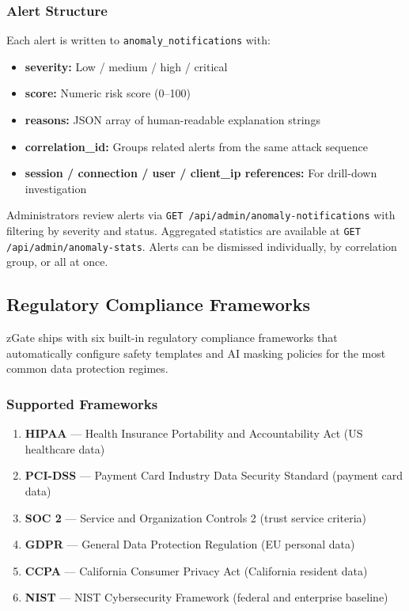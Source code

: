 \subsubsection{Alert Structure}

Each alert is written to \texttt{anomaly\_notifications} with:

\begin{itemize}[leftmargin=*]
    \item \textbf{severity:} Low / medium / high / critical
    \item \textbf{score:} Numeric risk score (0–100)
    \item \textbf{reasons:} JSON array of human-readable explanation strings
    \item \textbf{correlation\_id:} Groups related alerts from the same attack sequence
    \item \textbf{session / connection / user / client\_ip references:} For drill-down investigation
\end{itemize}

Administrators review alerts via \texttt{GET /api/admin/anomaly-notifications} with filtering by severity and status. Aggregated statistics are available at \texttt{GET /api/admin/anomaly-stats}. Alerts can be dismissed individually, by correlation group, or all at once.

\subsection{Regulatory Compliance Frameworks}
\label{subsec:compliance-frameworks}

zGate ships with six built-in regulatory compliance frameworks that automatically configure safety templates and AI masking policies for the most common data protection regimes.

\subsubsection{Supported Frameworks}

\begin{enumerate}[leftmargin=*]
    \item \textbf{HIPAA} — Health Insurance Portability and Accountability Act (US healthcare data)
    \item \textbf{PCI-DSS} — Payment Card Industry Data Security Standard (payment card data)
    \item \textbf{SOC 2} — Service and Organization Controls 2 (trust service criteria)
    \item \textbf{GDPR} — General Data Protection Regulation (EU personal data)
    \item \textbf{CCPA} — California Consumer Privacy Act (California resident data)
    \item \textbf{NIST} — NIST Cybersecurity Framework (federal and enterprise baseline)
\end{enumerate}

